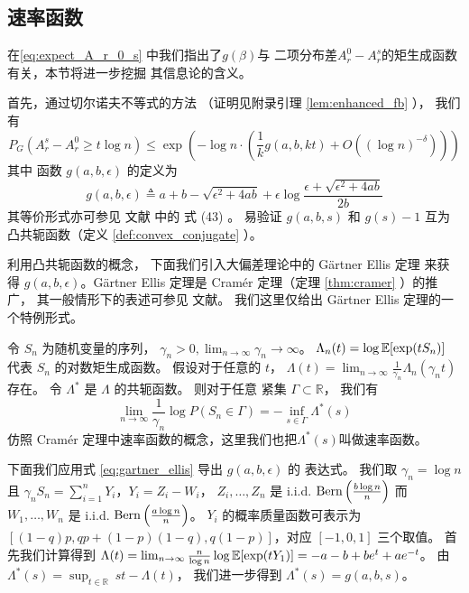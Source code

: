 \subsection{速率函数}\label{sub:rate_function}
在\eqref{eq:expect_A_r_0_s} 中我们指出了$g(\beta)$与
二项分布差$A_r^0 - A_r^s$的矩生成函数有关，本节将进一步挖掘
其信息论的含义。

首先，通过切尔诺夫不等式的方法
（证明见附录引理 \ref{lem:enhanced_fb} ），
我们有
\begin{equation}\label{eq:introduction_g_a_b_eps}
  P_G(A_r^s - A_r^0 \ge t  \log n) 
	\le  \exp\left(-\log n \cdot
	\left(
   \frac{1}{k} g(a,b,kt) + O\left((\log n)^{-\delta} \right) \right)\right)
\end{equation}
其中 函数 $g(a,b,\epsilon)$ 的定义为
\begin{equation}  \label{equation:g}
  g(a,b,\epsilon) \triangleq a + b - \sqrt{\epsilon^2 + 4ab} + \epsilon \log \frac{\epsilon + \sqrt{\epsilon^2 + 4ab}}{2b}
\end{equation}
其等价形式亦可参见 文献 中的 式 (43)
。
易验证
$g(a,b,s)$ 和 $g(s)-1$ 互为凸共轭函数（定义 \ref{def:convex_conjugate} ）。

利用凸共轭函数的概念，
下面我们引入大偏差理论中的 Gärtner Ellis 定理
来获得 $g(a,b,\epsilon)$。Gärtner Ellis 定理是
Cramér 定理（定理 \ref{thm:cramer} ）的推广，
其一般情形下的表述可参见
文献。
我们这里仅给出 Gärtner Ellis 定理的一个特例形式。

令 $S_n$ 为随机变量的序列，
$\gamma_n >0, \lim_{n\to \infty}\gamma_n \to \infty$。
$\Lambda_n(t)=\log \operatorname{\mathbb{E}}[\exp(t S_n)]$ 代表 $S_n$ 的对数矩生成函数。
假设对于任意的 $t$，
$\Lambda(t) =\lim_{n\to \infty} \frac{1}{\gamma_n}\Lambda_n(\gamma_n t)$
存在。 令 $\Lambda^*$ 是 $\Lambda$ 的共轭函数。
则对于任意 紧集 $\Gamma \subset \mathbb{R}$，
我们有
\begin{equation}\label{eq:gartner_ellis}
\lim_{n\to \infty} \frac{1}{\gamma_n}\log P(S_n \in \Gamma) = -\inf_{s \in \Gamma} \Lambda^*(s)
\end{equation}
仿照 Cramér 定理中速率函数的概念，这里我们也把$\Lambda^*(s)$叫做速率函数。

下面我们应用式 \eqref{eq:gartner_ellis}
导出 $g(a,b,\epsilon)$ 的
表达式。
我们取 $\gamma_n= \log n$ 且 $\gamma_n S_n = \sum_{i=1}^n Y_i$，$Y_i=Z_i - W_i$，
$Z_i, \dots, Z_n$ 是 i.i.d. $\operatorname{Bern}\left(\frac{b \log n}{n}\right)$ 而 $W_1, \dots, W_n$ 是 i.i.d. $\operatorname{Bern}\left(\frac{a \log n}{n}\right)$。
$Y_i$ 的概率质量函数可表示为 $[(1-q)p, qp+(1-p)(1-q), q(1-p)]$，对应 $[-1,0,1]$ 三个取值。
首先我们计算得到 
$\Lambda(t) = \lim_{n\to \infty} \frac{n}{\log n} \log \operatorname{\mathbb{E}}[\exp(t Y_1)]
=-a-b+be^t  + ae^{-t}$。
由 $\Lambda^*(s) = \sup_{t\in\mathbb{R}}\ st - \Lambda(t)$，
我们进一步得到 $\Lambda^*(s) = g(a,b,s)$。

